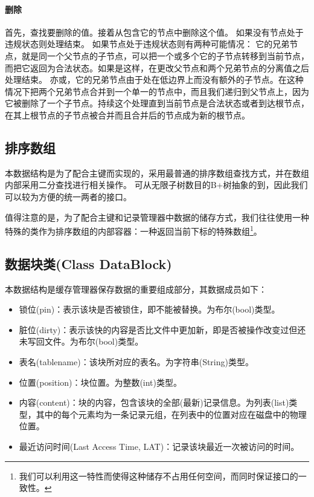 \documentclass[UTF8]{ctexrep} %
\begin{document}
\paragraph{删除}
首先，查找要删除的值。接着从包含它的节点中删除这个值。
如果没有节点处于违规状态则处理结束。
如果节点处于违规状态则有两种可能情况：
它的兄弟节点，就是同一个父节点的子节点，可以把一个或多个它的子节点转移到当前节点，而把它返回为合法状态。如果是这样，在更改父节点和两个兄弟节点的分离值之后处理结束。
亦或，它的兄弟节点由于处在低边界上而没有额外的子节点。在这种情况下把两个兄弟节点合并到一个单一的节点中，而且我们递归到父节点上，因为它被删除了一个子节点。持续这个处理直到当前节点是合法状态或者到达根节点，在其上根节点的子节点被合并而且合并后的节点成为新的根节点。

\subsection{排序数组}
本数据结构是为了配合主键而实现的，采用最普通的排序数组查找方式，并在数组内部采用二分查找进行相关操作。
可从无限子树数目的B+树抽象的到，因此我们可以较为方便的统一两者的接口。
\par
值得注意的是，为了配合主键和记录管理器中数据的储存方式，我们往往使用一种特殊的类作为排序数组的内部容器：一种返回当前下标的特殊数组\footnote{我们可以利用这一特性而使得这种储存不占用任何空间，而同时保证接口的一致性。}。

\subsection{数据块类(Class DataBlock)}
本数据结构是缓存管理器保存数据的重要组成部分，其数据成员如下：
\begin{itemize}
	\item 锁位(pin)：表示该块是否被锁住，即不能被替换。为布尔(bool)类型。
	\item 脏位(dirty)：表示该快的内容是否比文件中更加新，即是否被操作改变过但还未写回文件。为布尔(bool)类型。
	\item 表名(tablename)：该块所对应的表名。为字符串(String)类型。
	\item 位置(position)：块位置。为整数(int)类型。
	\item 内容(content)：块的内容，包含该块的全部(最新)记录信息。为列表(list)类型，其中的每个元素均为一条记录元组，在列表中的位置对应在磁盘中的物理位置。
	\item 最近访问时间(Last Access Time, LAT)：记录该块最近一次被访问的时间。
\end{itemize}
\end{document}
